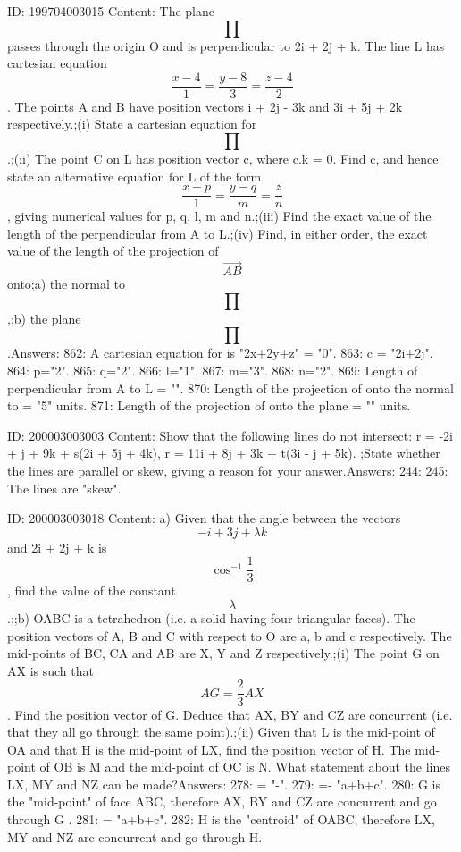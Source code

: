 \documentclass{article}
\begin{document}
ID: 199704003015
Content:
The plane \[\prod \] passes through the origin O and is perpendicular to 2i + 2j + k. The line L has cartesian equation \[\frac {x - 4}{1} = \frac {y - 8}{3} = \frac {z - 4}{2}\]. The points A and B have position vectors i + 2j - 3k and 3i + 5j + 2k respectively.;(i) State a cartesian equation for \[\prod \].;(ii) The point C on L has position vector c, where c.k = 0. Find c, and hence state an alternative equation for L of the form \[\frac {x - p}{1} = \frac {y - q}{m} = \frac {z}{n}\], giving numerical values for p, q, l, m and n.;(iii) Find the exact value of the length of the perpendicular from A to L.;(iv) Find, in either order, the exact value of the length of the projection of \[\overrightarrow{AB}\] onto;a) the normal to  \[\prod \],;b) the plane  \[\prod \].Answers:
862: A cartesian equation for \prod is "2x+2y+z" = "0".
863: c = "2i+2j".
864: p="2".
865: q="2".
866: l="1".
867: m="3".
868: n="2".
869: Length of perpendicular from A to L = "".
870: Length of the projection of  onto the normal to  \prod = "5" units.
871: Length of the projection of  onto the plane  \prod = "" units.

ID: 200003003003
Content:
Show that the following lines do not intersect: r = -2i + j + 9k + s(2i + 5j + 4k), r = 11i + 8j + 3k + t(3i - j + 5k). ;State whether the lines are parallel or skew, giving a reason for your answer.Answers:
244: 
245: The lines are "skew".

ID: 200003003018
Content:
a) Given that the angle between the vectors \[-i + 3j + \lambda k\] and 2i + 2j + k is \[\cos^{-1} \frac{1}{3}\], find the value of the constant \[\lambda\].;;b) OABC is a tetrahedron (i.e. a solid having four triangular faces). The position vectors of A, B and C with respect to O are a, b and c respectively. The mid-points of BC, CA and AB are X, Y and Z respectively.;(i) The point G on AX is such that \[AG = \frac{2}{3} AX\]. Find the position vector of G. Deduce that AX, BY and CZ are concurrent (i.e. that they all go through the same point).;(ii) Given that L is the mid-point of OA and that H is the mid-point of LX, find the position vector of H. The mid-point of OB is M and the mid-point of OC is N. What statement about the lines LX, MY and NZ can be made?Answers:
278: \lambda = "-".
279:  =- "a+b+c".
280: G is the "mid-point" of face ABC, therefore AX, BY and CZ are concurrent and go through G .
281:  = "a+b+c".
282: H is the "centroid" of OABC, therefore LX, MY and NZ are concurrent and go through H.
\end{document}
